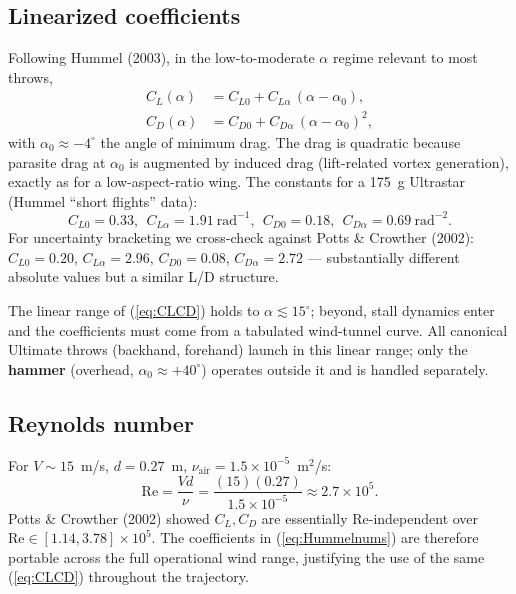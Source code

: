 \documentclass[11pt,letterpaper]{article}
\begin{document}
\subsection{Linearized coefficients}

Following Hummel (2003), in the low-to-moderate $\alpha$ regime relevant to most throws,
\begin{equation}
\begin{aligned}
C_L(\alpha) &= C_{L0} + C_{L\alpha}\,(\alpha - \alpha_0), \\
C_D(\alpha) &= C_{D0} + C_{D\alpha}\,(\alpha - \alpha_0)^2,
\end{aligned}
\label{eq:CLCD}
\end{equation}
with $\alpha_0 \approx -4^\circ$ the angle of minimum drag. The drag is quadratic because parasite drag at $\alpha_0$ is augmented by induced drag (lift-related vortex generation), exactly as for a low-aspect-ratio wing. The constants for a 175~g Ultrastar (Hummel ``short flights'' data):
\begin{equation}
C_{L0} = 0.33,\ \ C_{L\alpha} = 1.91\ \text{rad}^{-1},\ \
C_{D0} = 0.18,\ \ C_{D\alpha} = 0.69\ \text{rad}^{-2}.
\label{eq:Hummelnums}
\end{equation}
For uncertainty bracketing we cross-check against Potts \& Crowther (2002): $C_{L0}=0.20$, $C_{L\alpha}=2.96$, $C_{D0}=0.08$, $C_{D\alpha}=2.72$ --- substantially different absolute values but a similar L/D structure.

The linear range of (\ref{eq:CLCD}) holds to $\alpha \lesssim 15^\circ$; beyond, stall dynamics enter and the coefficients must come from a tabulated wind-tunnel curve. All canonical Ultimate throws (backhand, forehand) launch in this linear range; only the \textbf{hammer} (overhead, $\alpha_0 \approx +40^\circ$) operates outside it and is handled separately.

\subsection{Reynolds number}

For $V \sim 15$~m/s, $d = 0.27$~m, $\nu_{\text{air}} = 1.5\times10^{-5}$~m$^2$/s:
\begin{equation}
\mathrm{Re} = \frac{V d}{\nu} = \frac{(15)(0.27)}{1.5\times10^{-5}} \approx 2.7\times10^{5}.
\label{eq:Re}
\end{equation}
Potts \& Crowther (2002) showed $C_L, C_D$ are essentially Re-independent over $\mathrm{Re} \in [1.14, 3.78]\times10^5$. The coefficients in (\ref{eq:Hummelnums}) are therefore portable across the full operational wind range, justifying the use of the same (\ref{eq:CLCD}) throughout the trajectory.
\end{document}
